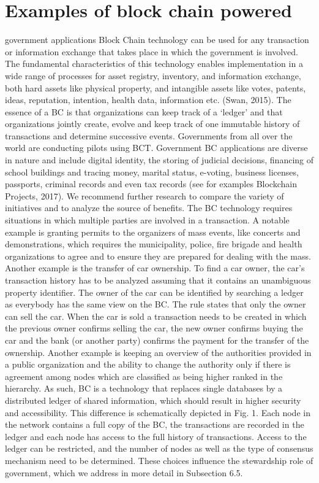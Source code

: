 \section{Examples of block chain powered} government applications
Block Chain technology can be used for any transaction or information exchange that takes place in which the government is involved. The fundamental characteristics of this technology enables implementation in a wide range of processes for asset registry, inventory, and information exchange, both hard assets like physical property, and intangible assets like votes, patents, ideas, reputation, intention, health data, information etc. (Swan, 2015). The essence of a BC is that organizations can keep track of a ‘ledger’ and that organizations jointly create, evolve and keep track of one immutable history of transactions and determine successive events.
Governments from all over the world are conducting pilots using BCT. Government BC applications are diverse in nature and include digital identity, the storing of judicial decisions, financing of school buildings and tracing money, marital status, e-voting, business licenses, passports, criminal records and even tax records (see for examples Blockchain Projects, 2017). We recommend further research to compare the variety of initiatives and to analyze the source of benefits.
The BC technology requires situations in which multiple parties are involved in a transaction. A notable example is granting permits to the organizers of mass events, like concerts and demonstrations, which requires the municipality, police, fire brigade and health organizations to agree and to ensure they are prepared for dealing with the mass. Another example is the transfer of car ownership. To find a car owner, the car's transaction history has to be analyzed assuming that it contains an unambiguous property identifier. The owner of the car can be identified by searching a ledger as everybody has the same view on the BC. The rule states that only the owner can sell the car. When the car is sold a transaction needs to be created in which the previous owner confirms selling the car, the new owner confirms buying the car and the bank (or another party) confirms the payment for the transfer of the ownership. Another example is keeping an overview of the authorities provided in a public organization and the ability to change the authority only if there is agreement among nodes which are classified as being higher ranked in the hierarchy. As such, BC is a technology that replaces single databases by a distributed ledger of shared information, which should result in higher security and accessibility. This difference is schematically depicted in Fig. 1. Each node in the network contains a full copy of the BC, the transactions are recorded in the ledger and each node has access to the full history of transactions. Access to the ledger can be restricted, and the number of nodes as well as the type of consensus mechanism need to be determined. These choices influence the stewardship role of government, which we address in more detail in Subsection 6.5.
